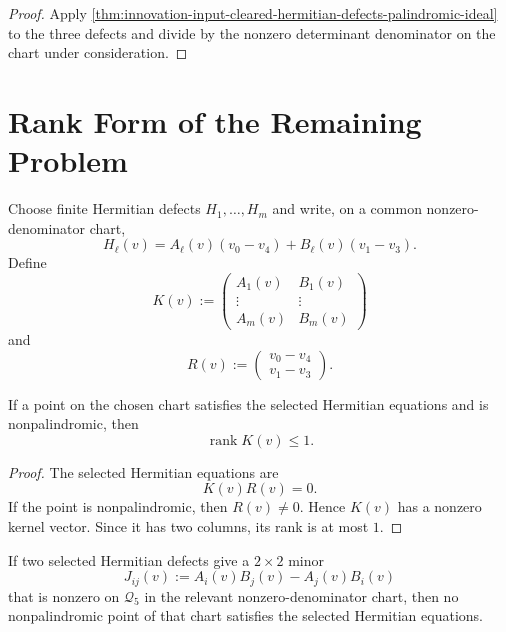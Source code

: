 \begin{proof}
Apply
\autoref{thm:innovation-input-cleared-hermitian-defects-palindromic-ideal}
to the three defects and divide by the nonzero determinant denominator on
the chart under consideration.
\end{proof}

\section{Rank Form of the Remaining Problem}
\label{sec:innovation-input-rank-form-remaining-problem}

\begin{definition}
\label{def:innovation-input-hermitian-coefficient-matrix}
Choose finite Hermitian defects $H_1,\ldots,H_m$ and write, on a common
nonzero-denominator chart,
$$
H_\ell(v)
=
A_\ell(v)(v_0-v_4)+B_\ell(v)(v_1-v_3).
$$
Define
$$
K(v):=
\begin{pmatrix}
A_1(v)&B_1(v)\\
\vdots&\vdots\\
A_m(v)&B_m(v)
\end{pmatrix}
$$
and
$$
R(v):=
\begin{pmatrix}
v_0-v_4\\
v_1-v_3
\end{pmatrix}.
$$
\end{definition}

\begin{theorem}
\label{thm:innovation-input-nonpalindromic-hermitian-rank-drop}
If a point on the chosen chart satisfies the selected Hermitian equations
and is nonpalindromic, then
$$
\operatorname{rank}K(v)\le1.
$$
\end{theorem}

\begin{proof}
The selected Hermitian equations are
$$
K(v)R(v)=0.
$$
If the point is nonpalindromic, then $R(v)\ne0$. Hence $K(v)$ has a
nonzero kernel vector. Since it has two columns, its rank is at most $1$.
\end{proof}

\begin{corollary}
\label{cor:innovation-input-minor-test-hermitian-rigidity}
If two selected Hermitian defects give a $2\times2$ minor
$$
J_{ij}(v):=A_i(v)B_j(v)-A_j(v)B_i(v)
$$
that is nonzero on $\mathcal Q_5$ in the relevant nonzero-denominator
chart, then no nonpalindromic point of that chart satisfies the selected
Hermitian equations.
\end{corollary}

